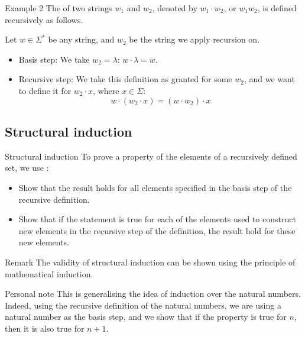 \documentclass[a4paper]{article}
\begin{document}
\begin{parag}{Example 2}
    The  of two strings $w_1$ and $w_2$, denoted by $w_1 \cdot w_2$, or $w_1w_2$, is defined recursively as follows.

    Let $w \in \Sigma^*$ be any string, and $w_2$ be the string we apply recursion on.
    \begin{itemize}
        \item Basis step: We take $w_2 = \lambda$: $w\cdot \lambda = w$.
        \item Recursive step: We take this definition as granted for some $w_2$, and we want to define it for $w_2\cdot x$, where $x \in \Sigma$: 
            \[w \cdot \left(w_2 \cdot x\right) = \left(w \cdot w_2\right)\cdot x\]
    \end{itemize}
\end{parag}

\subsection{Structural induction}
\begin{parag}{Structural induction}
    To prove a property of the elements of a recursively defined set, we use :
    \begin{itemize}
        \item {} Show that the result holds for all elements specified in the basis step of the recursive definition.
        \item {} Show that if the statement is true for each of the elements used to construct new elements in the recursive step of the definition, the result hold for these new elements.
    \end{itemize}

    \begin{subparag}{Remark}
        The validity of structural induction can be shown using the principle of mathematical induction.
    \end{subparag}

    \begin{subparag}{Personal note}
        This is generalising the idea of induction over the natural numbers. Indeed, using the recursive definition of the natural numbers, we are using a natural number as the basis step, and we show that if the property is true for $n$, then it is also true for $n+1$.
    \end{subparag}
    
\end{parag}
\end{document}

